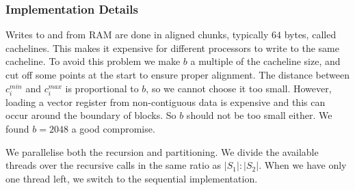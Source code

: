 \subsubsection{Implementation Details}

Writes to and from RAM are done in aligned chunks, typically $64$ bytes, called
cachelines. This makes it expensive for different processors to write to the 
same cacheline. To avoid this problem we make $b$ a multiple of
the cacheline size, and cut off some points at the start to ensure proper
alignment. The distance between $c_i^{min}$ and $c_i^{max}$ is proportional
to $b$, so we cannot choose it too small. However, loading a vector register 
from non-contiguous data is expensive and this can occur around the boundary
of blocks. So $b$ should not be too small either. We found $b = 2048$ a good
compromise.

We parallelise both the recursion and partitioning. We divide the available
threads over the recursive calls in the same ratio as $|S_1| : |S_2|$. When
we have only one thread left, we switch to the sequential implementation.
